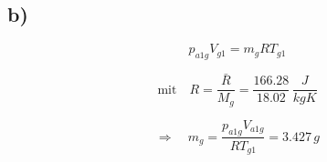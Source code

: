 

\subsection*{b)}

\[
p_{a1g} V_{g1} = m_g R T_{g1}
\]

\[
\text{mit} \quad R = \frac{\bar{R}}{M_g} = \frac{166.28}{18.02} \, \frac{J}{kgK}
\]

\[
\Rightarrow \quad m_g = \frac{p_{a1g} V_{a1g}}{R T_{g1}} = 3.427 \, g
\]